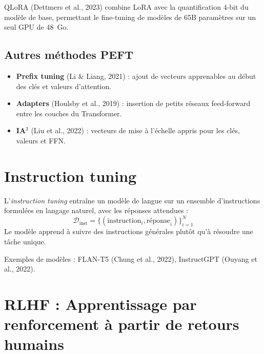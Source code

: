 \begin{definition}[QLoRA]
QLoRA (Dettmers et al., 2023) combine LoRA avec la quantification 4-bit du
mod\`ele de base, permettant le fine-tuning de mod\`eles de 65B param\`etres
sur un seul GPU de 48~Go.
\end{definition}

\subsection{Autres m\'ethodes PEFT}

\begin{itemize}
    \item \textbf{Prefix tuning} (Li \& Liang, 2021) : ajout de vecteurs
          apprenables au d\'ebut des cl\'es et valeurs d'attention.
    \item \textbf{Adapters} (Houlsby et al., 2019) : insertion de petits
          r\'eseaux feed-forward entre les couches du Transformer.
    \item \textbf{IA$^3$} (Liu et al., 2022) : vecteurs de mise \`a l'\'echelle
          appris pour les cl\'es, valeurs et FFN.
\end{itemize}

\section{Instruction tuning}
\label{sec:ft:instruction}

\begin{definition}
L'\emph{instruction tuning} entra\^ine un mod\`ele de langue sur un ensemble
d'instructions formul\'ees en langage naturel, avec les r\'eponses attendues :
\[
\mathcal{D}_{\text{inst}} = \{(\text{instruction}_i, \text{r\'eponse}_i)\}_{i=1}^{N}
\]
Le mod\`ele apprend \`a suivre des instructions g\'en\'erales plut\^ot qu'\`a
r\'esoudre une t\^ache unique.
\end{definition}

Exemples de mod\`eles : FLAN-T5 (Chung et al., 2022), InstructGPT (Ouyang et
al., 2022).

\section{RLHF : Apprentissage par renforcement \`a partir de retours humains}
\label{sec:ft:rlhf}


